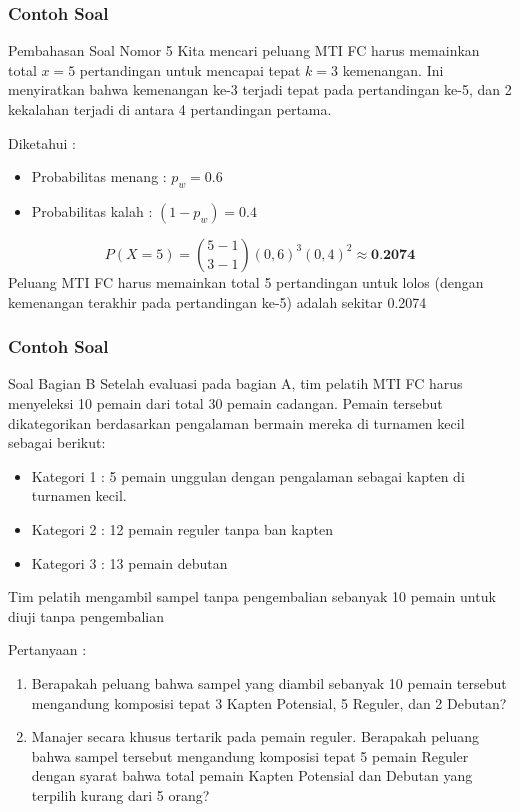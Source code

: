 \documentclass[]{beamer}
\begin{document}
\begin{frame}
    \frametitle{Contoh Soal}
    \scriptsize
    \begin{exampleblock}{Pembahasan Soal Nomor 5}
    Kita mencari peluang MTI FC harus memainkan total $x=5$ pertandingan untuk mencapai tepat $k=3$ kemenangan. Ini menyiratkan bahwa kemenangan ke-3 terjadi tepat pada pertandingan ke-5, dan 2 kekalahan terjadi di antara 4 pertandingan pertama. 

    Diketahui :
    \begin{itemize}
        \item Probabilitas menang : $p_w = 0.6$
        \item Probabilitas kalah : $(1-p_w) = 0.4$
    \end{itemize}
    \begin{equation*}
    P(X=5)=\binom{5-1}{3-1}(0,6)^3(0,4)^2 \approx \textbf{0.2074}
    \end{equation*}
    Peluang MTI FC harus memainkan total 5 pertandingan untuk lolos (dengan kemenangan terakhir pada pertandingan ke-5) adalah sekitar 0.2074
    \end{exampleblock}
\end{frame}

\begin{frame}
    \frametitle{Contoh Soal}
    \scriptsize
    \begin{block}{Soal Bagian B}
        Setelah evaluasi pada bagian A, tim pelatih MTI FC harus menyeleksi 10 pemain dari total 30 pemain cadangan. Pemain tersebut dikategorikan berdasarkan pengalaman bermain mereka di turnamen kecil sebagai berikut:
        \begin{itemize}
            \item Kategori 1 : 5 pemain unggulan dengan pengalaman sebagai kapten di turnamen kecil.
            \item Kategori 2 : 12 pemain reguler tanpa ban kapten
            \item Kategori 3 : 13 pemain debutan
        \end{itemize}
        Tim pelatih mengambil sampel tanpa pengembalian sebanyak 10 pemain untuk diuji tanpa pengembalian
        
        Pertanyaan :
        \begin{enumerate}
            \item Berapakah peluang bahwa sampel yang diambil sebanyak 10 pemain tersebut mengandung komposisi tepat 3 Kapten Potensial, 5 Reguler, dan 2 Debutan?
            \item Manajer secara khusus tertarik pada pemain reguler. Berapakah peluang bahwa sampel tersebut mengandung komposisi tepat 5 pemain Reguler dengan syarat bahwa total pemain Kapten Potensial dan Debutan yang terpilih kurang dari 5 orang?
        \end{enumerate}
    \end{block}
\end{frame}
\end{document}
